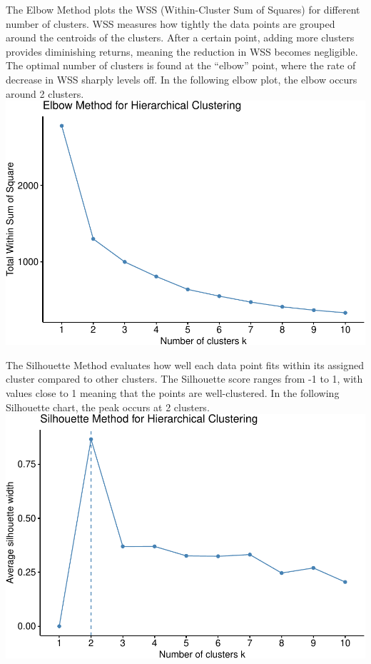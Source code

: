 \documentclass[
]{article}
\begin{document}
The Elbow Method plots the WSS (Within-Cluster Sum of Squares) for
different number of clusters. WSS measures how tightly the data points
are grouped around the centroids of the clusters. After a certain point,
adding more clusters provides diminishing returns, meaning the reduction
in WSS becomes negligible. The optimal number of clusters is found at
the ``elbow'' point, where the rate of decrease in WSS sharply levels
off. In the following elbow plot, the elbow occurs around 2 clusters.
\includegraphics{Final-Report_files/figure-latex/heirarchical optimal cluster elbow-1.pdf}

The Silhouette Method evaluates how well each data point fits within its
assigned cluster compared to other clusters. The Silhouette score ranges
from -1 to 1, with values close to 1 meaning that the points are
well-clustered. In the following Silhouette chart, the peak occurs at 2
clusters.
\includegraphics{Final-Report_files/figure-latex/heirarchical optimal cluster silhouette-1.pdf}
\end{document}
